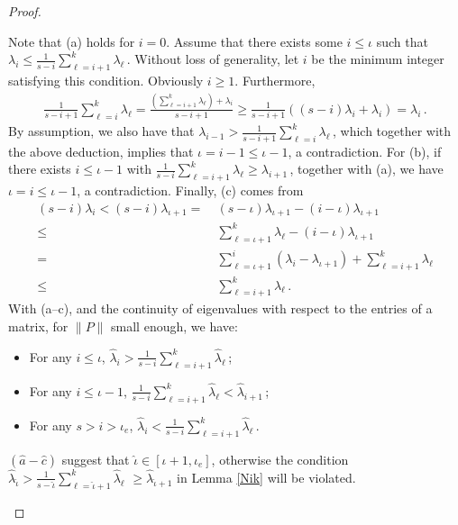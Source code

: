 \documentclass[smallextended]{svjour3hack}       %
\begin{document}
\begin{proof}
\begin{itemize}
Note that (a) holds for $i=0$. Assume that there exists some $i\le \iota$ such that $\lambda_i \le \frac{1}{s-i}\sum_{\ell=i+1}^k \lambda_{\ell}$\,. Without loss of generality, let $i$ be the minimum integer satisfying this condition. Obviously $i\ge 1$. Furthermore,
\begin{align*}
    \textstyle\frac{1}{s-i+1}\sum_{\ell=i}^k \lambda_{\ell}=  \frac{\left(\sum_{\ell=i+1}^k \lambda_{\ell}\right) + \lambda_i}{s-i+1} \ge \frac{1}{s-i+1} ((s-i)\lambda_i + \lambda_i) = \lambda_i\,.
\end{align*}
By assumption, we also have that $\lambda_{i-1}>\frac{1}{s-i+1}\sum_{\ell=i}^k \lambda_{\ell}$\,, which together with the above deduction, implies that $\iota = i-1\le \iota-1$, a contradiction.
For (b), if there exists $i\le \iota-1$ with $\frac{1}{s-i}\sum_{\ell=i+1}^k \lambda_{\ell} \ge \lambda_{i+1}$\,, together with (a), we have $\iota = i\le \iota-1$, a contradiction. Finally, (c) comes from
\begin{align*}
        (s-i)\lambda_i < (s-i)\lambda_{\iota+1} = &~ (s-\iota)\lambda_{\iota+1}- (i-\iota)\lambda_{\iota+1}\\
        \le &~ \textstyle\sum_{\ell=\iota+1}^k \lambda_{\ell}- (i-\iota)\lambda_{\iota+1}\\
        = &~ \textstyle\sum_{\ell=\iota+1}^i (\lambda_{i}-\lambda_{\iota+1}) + \sum_{\ell=i+1}^k \lambda_\ell\\
        \le & ~\textstyle\sum_{\ell=i+1}^k \lambda_\ell\,.
    \end{align*}
    With (a--c), and the continuity of eigenvalues with respect to the entries of a matrix, for $\|P\|$ small enough, we have:
    \begin{itemize}
        \item[($\hat a$)] For any $i\le \iota$, $\hat \lambda_i > \frac{1}{s-i}\sum_{\ell=i+1}^k \hat\lambda_{\ell}$\,;
        \item[($\hat b$)] For any $i\le \iota-1$, $\frac{1}{s-i}\sum_{\ell=i+1}^k \hat \lambda_{\ell} < \hat \lambda_{i+1}$\,;
        \item[($\hat c$)] For any $s> i> \iota_e$, $\hat \lambda_i < \frac{1}{s-i}\sum_{\ell=i+1}^k\hat \lambda_{\ell}$\,.
    \end{itemize}
    $(\hat a-\hat c)$ suggest that $\hat \iota \in [\iota+1, \iota_e]$, otherwise the condition $
 \hat \lambda_{\hat \iota}>\frac{1}{s-\hat \iota}\sum_{\ell=\hat \iota+1}^k \hat \lambda_{\ell}$ $\geq \hat \lambda_{\hat \iota +1}$ in Lemma \ref{Nik} will be violated.


\end{itemize}
\end{proof}
\end{document}

